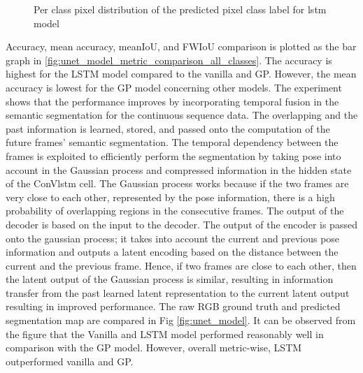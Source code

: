 	\begin{figure}%
		\centering
		\qquad
		\caption{Per class pixel distribution of the predicted pixel class label for lstm model}%
		\label{fig:y_gt_and_predic_lstm}%
	\end{figure}

	Accuracy, mean accuracy, meanIoU, and FWIoU comparison is plotted as the bar graph in \ref{fig:unet_model_metric_comparison_all_classes}. The accuracy is highest for the LSTM model compared to the vanilla and GP. However, the mean accuracy is lowest for the GP model concerning other models. The experiment shows that the performance improves by incorporating temporal fusion in the semantic segmentation for the continuous sequence data. The overlapping and the past information is learned, stored, and passed onto the computation of the future frames' semantic segmentation. The temporal dependency between the frames is exploited to efficiently perform the segmentation by taking pose into account in the Gaussian process and compressed information in the hidden state of the ConVlstm cell. The Gaussian process works because if the two frames are very close to each other, represented by the pose information, there is a high probability of overlapping regions in the consecutive frames. The output of the decoder is based on the input to the decoder. The output of the encoder is passed onto the gaussian process; it takes into account the current and previous pose information and outputs a latent encoding based on the distance between the current and the previous frame. Hence, if two frames are close to each other, then the latent output of the Gaussian process is similar, resulting in information transfer from the past learned latent representation to the current latent output resulting in improved performance. The raw RGB ground truth and predicted segmentation map are compared in Fig \ref{fig:unet_model}. It can be observed from the figure that the Vanilla and LSTM model performed reasonably well in comparison with the GP model. However, overall metric-wise, LSTM outperformed vanilla and GP.   
	
